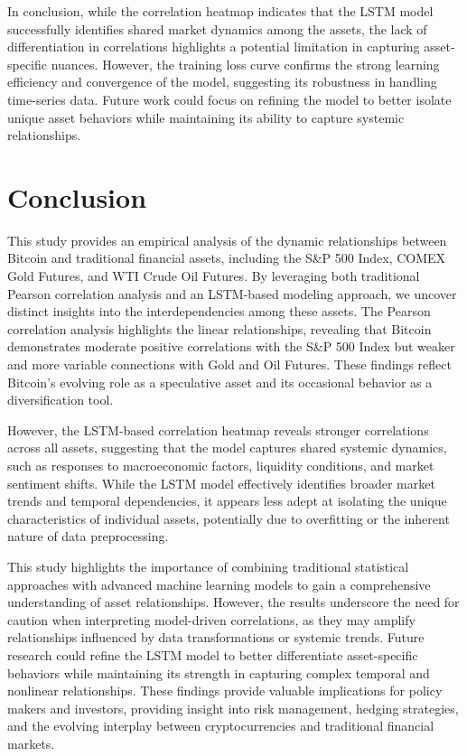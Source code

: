 \documentclass{article}
\begin{document}
In conclusion, while the correlation heatmap indicates that the LSTM model successfully identifies shared market dynamics among the assets, the lack of differentiation in correlations highlights a potential limitation in capturing asset-specific nuances. However, the training loss curve confirms the strong learning efficiency and convergence of the model, suggesting its robustness in handling time-series data. Future work could focus on refining the model to better isolate unique asset behaviors while maintaining its ability to capture systemic relationships.

\section{Conclusion}


This study provides an empirical analysis of the dynamic relationships between Bitcoin and traditional financial assets, including the S\&P 500 Index, COMEX Gold Futures, and WTI Crude Oil Futures. By leveraging both traditional Pearson correlation analysis and an LSTM-based modeling approach, we uncover distinct insights into the interdependencies among these assets. The Pearson correlation analysis highlights the linear relationships, revealing that Bitcoin demonstrates moderate positive correlations with the S\&P 500 Index but weaker and more variable connections with Gold and Oil Futures. These findings reflect Bitcoin’s evolving role as a speculative asset and its occasional behavior as a diversification tool.

However, the LSTM-based correlation heatmap reveals stronger correlations across all assets, suggesting that the model captures shared systemic dynamics, such as responses to macroeconomic factors, liquidity conditions, and market sentiment shifts. While the LSTM model effectively identifies broader market trends and temporal dependencies, it appears less adept at isolating the unique characteristics of individual assets, potentially due to overfitting or the inherent nature of data preprocessing.

This study highlights the importance of combining traditional statistical approaches with advanced machine learning models to gain a comprehensive understanding of asset relationships. However, the results underscore the need for caution when interpreting model-driven correlations, as they may amplify relationships influenced by data transformations or systemic trends. Future research could refine the LSTM model to better differentiate asset-specific behaviors while maintaining its strength in capturing complex temporal and nonlinear relationships. These findings provide valuable implications for policy makers and investors, providing insight into risk management, hedging strategies, and the evolving interplay between cryptocurrencies and traditional financial markets.



\newpage


\end{document}
